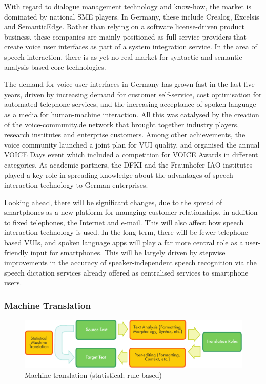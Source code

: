 \documentclass[]{../../metanetpaper}
\begin{document}
\begin{multicols}{2}
With regard to dialogue management technology and know-how, the market is dominated by national SME players. In Germany, these include Crealog, Excelsis and SemanticEdge. Rather than relying on a software license-driven product business, these companies are mainly positioned as full-service providers that create voice user interfaces as part of a system integration service. In the area of speech interaction, there is as yet no real market for syntactic and semantic analysis-based core technologies.

The demand for voice user interfaces in Germany has grown fast in the last five years, driven by increasing demand for customer self-service, cost optimisation for automated telephone services, and the increasing acceptance of spoken language as a media for human-machine interaction. All this was catalysed by the creation of the voice-community.de network that brought together industry players, research institutes and enterprise customers. Among other achievements, the voice community launched a joint plan for VUI quality, and organised the annual VOICE Days event which included a competition for VOICE Awards in different categories. As academic partners, the DFKI and the Fraunhofer IAO institutes played a key role in spreading knowledge about the advantages of speech interaction technology to German enterprises.

Looking ahead, there will be significant changes, due to the spread of smartphones as a new platform for managing customer relationships, in addition to fixed telephones, the Internet and e-mail. This will also affect how speech interaction technology is used. In the long term, there will be fewer telephone-based VUIs, and spoken language apps will play a far more central role as a user-friendly input for smartphones. This will be largely driven by stepwise improvements in the accuracy of speaker-independent speech recognition via the speech dictation services already offered as centralised services to smartphone users.

\subsubsection{Machine Translation}

\begin{figure}[htb]
  \center
  \includegraphics[width=\textwidth]{../_media/english/machine_translation}
  \caption{Machine translation (statistical; rule-based)}
  \label{fig:mtarch_en}
\end{figure}


\end{multicols}
\end{document}
